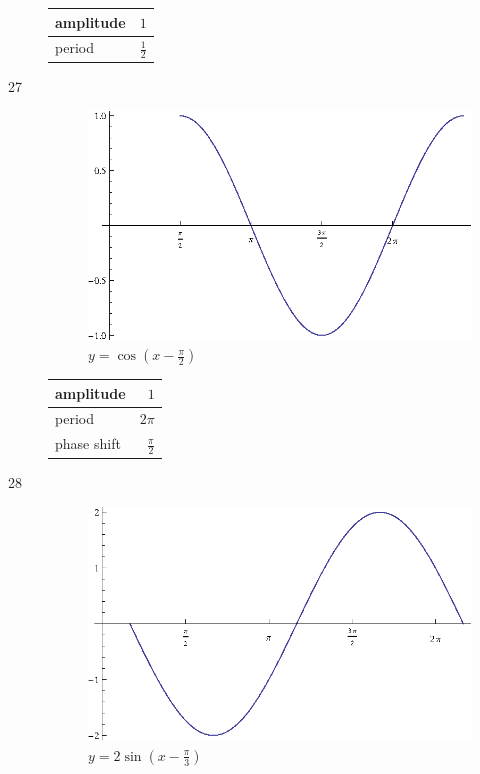 \documentclass{exam}
\begin{document}
\begin{description}
        \begin{tabular}[H]{lr}
          \toprule
          amplitude & $1$ \\
          \midrule
          period & $\frac{1}{2}$ \\
          \bottomrule
        \end{tabular}

      \item[27]
        \begin{figure}[H]
          \centering
          \includegraphics[scale=0.8]{exercise27.eps}
          \caption{$y = \cos \left( x - \frac{\pi}{2} \right)$}
        \end{figure}

        \begin{tabular}[H]{lr}
          \toprule
          amplitude & $1$ \\
          \midrule
          period & $2 \pi$ \\
          \midrule
          phase shift & $\frac{\pi}{2}$ \\
          \bottomrule
        \end{tabular}

      \item[28]
        \begin{figure}[H]
          \centering
          \includegraphics[scale=0.8]{exercise28.eps}
          \caption{$y = 2 \sin \left( x - \frac{\pi}{3} \right)$}
        \end{figure}


\end{description}
\end{document}
